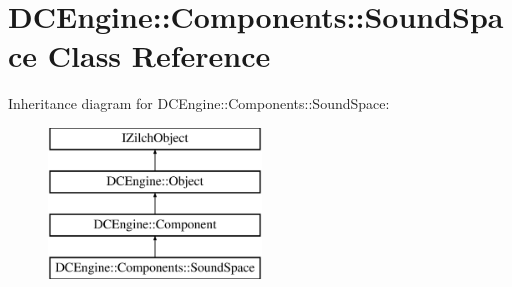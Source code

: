 \hypertarget{classDCEngine_1_1Components_1_1SoundSpace}{\section{D\-C\-Engine\-:\-:Components\-:\-:Sound\-Space Class Reference}
\label{classDCEngine_1_1Components_1_1SoundSpace}
}
Inheritance diagram for D\-C\-Engine\-:\-:Components\-:\-:Sound\-Space\-:\begin{figure}[H]
\begin{center}
\leavevmode
\includegraphics[height=4.000000cm]{classDCEngine_1_1Components_1_1SoundSpace}
\end{center}
\end{figure}

